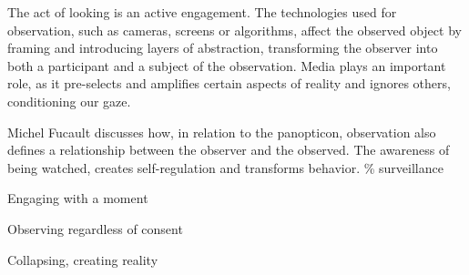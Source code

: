 The act of looking is an active engagement. The technologies used for observation, such as cameras, screens or algorithms, affect the observed object by framing and introducing layers of abstraction, transforming the observer into both a participant and a subject of the observation. Media plays an important role, as it pre-selects and amplifies certain aspects of reality and ignores others, conditioning our gaze.

Michel Fucault discusses how, in relation to the panopticon, observation also defines a relationship between the observer and the observed. The awareness of being watched, creates self-regulation and transforms behavior. {\scriptsize \textcolor{comment}{\%  surveillance }} \citep{foucault1975}


Engaging with a moment

Observing regardless of consent

Collapsing, creating reality
